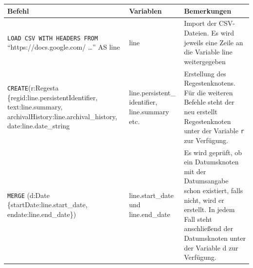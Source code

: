 \documentclass[ngerman,]{scrreprt}
\begin{document}
\begin{longtable}[]{@{}lll@{}}
\toprule
\begin{minipage}[b]{0.31\columnwidth}\raggedright
Befehl\strut
\end{minipage} & \begin{minipage}[b]{0.23\columnwidth}\raggedright
Variablen\strut
\end{minipage} & \begin{minipage}[b]{0.37\columnwidth}\raggedright
Bemerkungen\strut
\end{minipage}\tabularnewline
\midrule
\endhead
\begin{minipage}[t]{0.31\columnwidth}\raggedright
\texttt{LOAD\ CSV\ WITH\ HEADERS\ FROM} ``https://docs.google.com/ \ldots{}'' AS line\strut
\end{minipage} & \begin{minipage}[t]{0.23\columnwidth}\raggedright
line\strut
\end{minipage} & \begin{minipage}[t]{0.37\columnwidth}\raggedright
Import der CSV-Dateien. Es wird jeweils eine Zeile an die Variable line weitergegeben\strut
\end{minipage}\tabularnewline
\begin{minipage}[t]{0.31\columnwidth}\raggedright
\texttt{CREATE}(r:Regesta \{regid:line.persistentIdentifier, text:line.summary, archivalHistory:line.archival\_history, date:line.date\_string\strut
\end{minipage} & \begin{minipage}[t]{0.23\columnwidth}\raggedright
line.persistent\_ identifier, line.summary etc.\strut
\end{minipage} & \begin{minipage}[t]{0.37\columnwidth}\raggedright
Erstellung des Regestenknotens. Für die weiteren Befehle steht der neu erstellt Regestenknoten unter der Variable \texttt{r} zur Verfügung.\strut
\end{minipage}\tabularnewline
\begin{minipage}[t]{0.31\columnwidth}\raggedright
\texttt{MERGE} (d:Date \{startDate:line.start\_date, endate:line.end\_date\})\strut
\end{minipage} & \begin{minipage}[t]{0.23\columnwidth}\raggedright
line.start\_date und line.end\_date\strut
\end{minipage} & \begin{minipage}[t]{0.37\columnwidth}\raggedright
Es wird geprüft, ob ein Datumsknoten mit der Datumsangabe schon existiert, falls nicht, wird er erstellt. In jedem Fall steht anschließend der Datumsknoten unter der Variable d zur Verfügung.\strut

\end{minipage}
\end{longtable}
\end{document}
